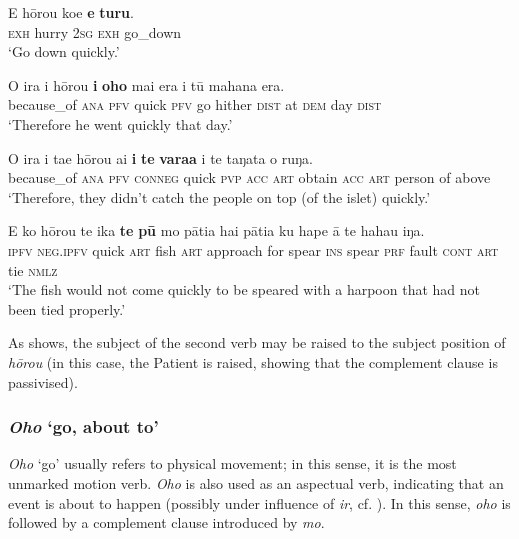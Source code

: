 \ea\label{ex:11.55}
\gll E hōrou koe \textbf{e} \textbf{turu}. \\
\textsc{exh} hurry \textsc{2sg} \textsc{exh} go\_down \\

\glt 
‘Go down quickly.’ \textstyleExampleref{[R231.143]} 
\z

\ea\label{ex:11.56}
\gll {\ꞌ}O ira i hōrou \textbf{i} \textbf{oho} mai era {\ꞌ}i tū mahana era. \\
because\_of \textsc{ana} \textsc{pfv} quick \textsc{pfv} go hither \textsc{dist} at \textsc{dem} day \textsc{dist} \\

\glt 
‘Therefore he went quickly that day.’ \textstyleExampleref{[R105.108]} 
\z

\ea\label{ex:11.57}
\gll {\ꞌ}O ira i ta{\ꞌ}e hōrou ai \textbf{i} \textbf{te} \textbf{vara{\ꞌ}a} i te taŋata o ruŋa. \\
because\_of \textsc{ana} \textsc{pfv} \textsc{conneg} quick \textsc{pvp} \textsc{acc} \textsc{art} obtain \textsc{acc} \textsc{art} person of above \\

\glt 
‘Therefore, they didn’t catch the people on top (of the islet) quickly.’ \textstyleExampleref{[R304.048]} 
\z

\ea\label{ex:11.58}
\gll E ko hōrou te ika \textbf{te} \textbf{pū} mo pātia hai pātia ku hape {\ꞌ}ā  te haha{\ꞌ}u iŋa.\\
\textsc{ipfv} \textsc{neg.ipfv} quick \textsc{art} fish \textsc{art} approach for spear \textsc{ins} spear \textsc{prf} fault \textsc{cont}  \textsc{art} tie \textsc{nmlz}\\

\glt
‘The fish would not come quickly to be speared with a harpoon that had not been tied properly.’ \textstyleExampleref{[R360.019]} 
\z

As  shows, the subject of the second verb may be raised to the subject position of \textit{hōrou} (in this case, the Patient is raised, showing that the complement clause is passivised).

\subsubsection{\textit{Oho} ‘go, about to’}\label{sec:11.3.2.4}
\textit{Oho} ‘go’ usually refers to physical movement; in this sense, it is the most unmarked motion verb. \textit{Oho} is also used as an aspectual verb, indicating that an event is about to happen (possibly under influence of  \textit{ir}, cf. \citealt[392]{Fischer2007}). In this sense, \textit{oho} is followed by a complement clause introduced by \textit{mo}.

